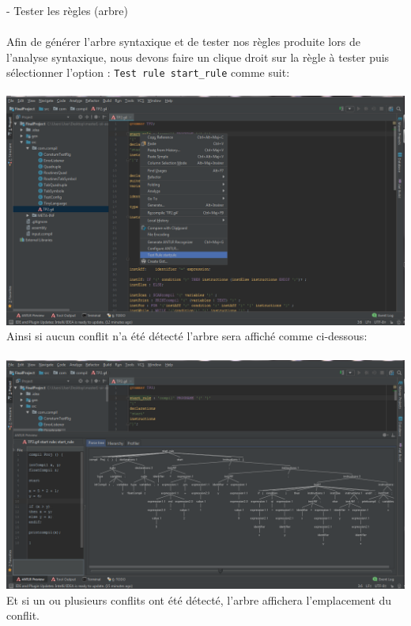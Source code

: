 \documentclass[12pt]{article}
\begin{document}
\texttt{ }\\
-	Tester les règles (arbre)\\
\texttt{ }\\
Afin de générer l'arbre syntaxique et de tester nos règles produite lors de l'analyse syntaxique, nous devons faire un clique droit sur la règle à tester puis sélectionner l'option : \texttt{Test rule start\_rule} comme suit:\\
\texttt{ }\\
\includegraphics[width=1\textwidth]{IMG/TestRule.png}
\texttt{ }\\
Ainsi si aucun conflit n'a été détecté l'arbre sera affiché comme ci-dessous:\\
\texttt{ }\\
\includegraphics[width=1\textwidth]{IMG/TestRule2.png}
\texttt{ }\\
Et si un ou plusieurs conflits ont été détecté, l'arbre affichera l'emplacement du conflit.\\
\end{document}
